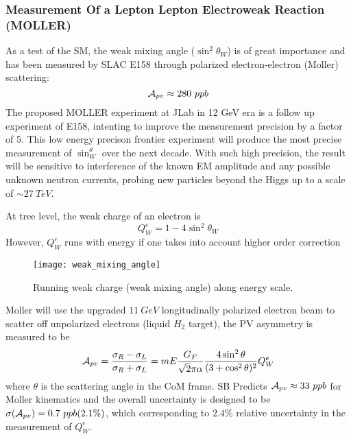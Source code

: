 \subsubsection{Measurement Of a Lepton Lepton Electroweak Reaction (MOLLER)}
As a test of the SM, the weak mixing angle ($\sin^2\theta_W$) is of great importance 
and has been measured by SLAC E158 through polarized electron-electron (Moller) scattering:
\begin{equation}
    \mathcal{A}_{pv} \approx 280 \ ppb
\end{equation}
The proposed MOLLER experiment at JLab in 12 GeV era is a follow up experiment 
of E158, intenting to improve the measurement precision by a factor of 5.
This low energy precison frontier experiment will produce the most precise 
measurement of $\sin^\theta_W$ over the next decade. With such high precision,
the result will be sensitive to interference of the known EM amplitude and any
possible unknown neutron currents, probing new particles beyond the Higgs up
to a scale of $\sim 27\ TeV$.

At tree level, the weak charge of an electron is
\begin{equation}
    Q_W^e = 1 - 4\sin^2\theta_W
\end{equation}
However, $Q_W^e$ runs with energy if one takes into account higher order correction
\begin{figure}
    \centering
    \texttt{[image: weak\_mixing\_angle]}
    \caption{Running weak charge (weak mixing angle) along energy scale.}
\end{figure}
Moller will use the upgraded $11\ GeV$ longitudinally polarized electron beam 
to scatter off unpolarized electrons (liquid $H_2$ target), the PV asymmetry
is measured to be
\begin{equation}
    \mathcal{A}_{pv} = \frac{\sigma_R - \sigma_L}{\sigma_R + \sigma_L}
    = mE\frac{G_F}{\sqrt{2}\pi\alpha}\frac{4\sin^2\theta}{(3+\cos^2\theta)^2} Q_W^e
\end{equation}
where $\theta$ is the scattering angle in the CoM frame. SB Predicts $\mathcal{A}_{pv} \approx 33 \ ppb$
for Moller kinematics and the overall uncertainty is designed to be $\sigma(\mathcal{A}_{pv}) = 0.7 \ ppb (2.1\%)$,
which corresponding to $2.4\%$ relative uncertainty in the measurement of $Q_W^e$.


